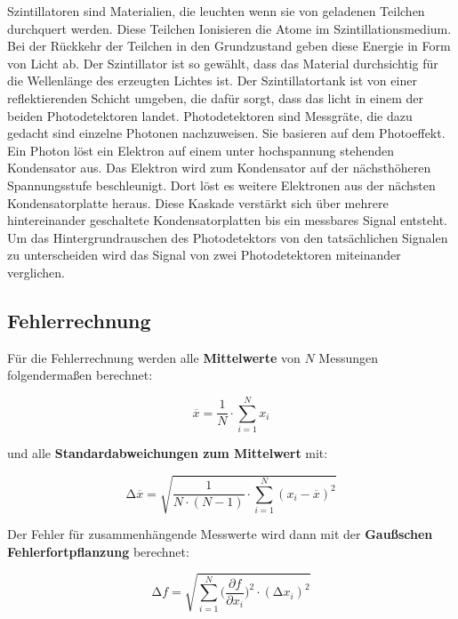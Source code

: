 Szintillatoren sind Materialien, die leuchten wenn sie von geladenen Teilchen durchquert werden.
Diese Teilchen Ionisieren die Atome im Szintillationsmedium. Bei der Rückkehr der Teilchen in den
Grundzustand geben diese Energie in Form von Licht ab. Der Szintillator ist so gewählt, dass das
Material durchsichtig für die Wellenlänge des erzeugten Lichtes ist.
Der Szintillatortank ist von einer reflektierenden Schicht umgeben, die dafür sorgt, dass das licht in
einem der beiden Photodetektoren landet.
Photodetektoren sind Messgräte, die dazu gedacht sind einzelne Photonen nachzuweisen.
Sie basieren auf dem Photoeffekt. Ein Photon löst ein Elektron auf einem unter hochspannung stehenden Kondensator aus.
Das Elektron wird zum Kondensator auf der nächsthöheren Spannungsstufe beschleunigt. Dort löst es weitere Elektronen
aus der nächsten Kondensatorplatte heraus. Diese Kaskade verstärkt sich über mehrere hintereinander geschaltete Kondensatorplatten
bis ein messbares Signal entsteht. 
Um das Hintergrundrauschen des Photodetektors von den tatsächlichen Signalen zu unterscheiden wird das Signal von zwei Photodetektoren
miteinander verglichen.


\subsection{Fehlerrechnung}
Für die Fehlerrechnung werden alle \textbf{Mittelwerte} von $N$ Messungen folgendermaßen berechnet:

\begin{equation}
	\overline{x} = \frac{1}{N} \cdot \sum_{i=1}^N x_i
	\label{eqn:Mittelwert}
\end{equation}

und alle \textbf{Standardabweichungen zum Mittelwert} mit:

\begin{equation}
	\increment\overline{x} = \sqrt{\frac{1}{N\cdot(N-1)}\cdot\sum_{i=1}^N (x_i-\overline{x})^2}
	\label{eqn:St_Mittelwert}
\end{equation}

Der Fehler für zusammenhängende Messwerte wird dann mit der \textbf{Gaußschen Fehlerfortpflanzung} berechnet:

\begin{equation}
	\increment{f} = \sqrt{ \sum_{i = 1}^{N}  \biggl(\frac{\partial{f}}{\partial{x_i}}\biggr)^2\cdot(\increment{x_i})^2}
	\label{eqn:Gauss}
\end{equation}

